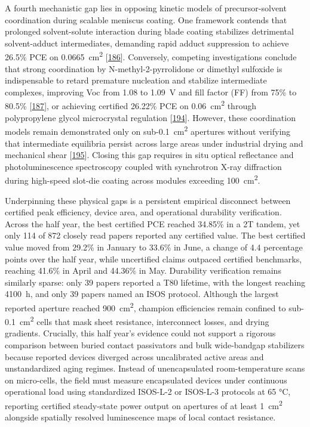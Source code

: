\documentclass[
  11pt,
]{article}
\begin{document}
A fourth mechanistic gap lies in opposing kinetic models of
precursor-solvent coordination during scalable meniscus coating. One
framework contends that prolonged solvent-solute interaction during
blade coating stabilizes detrimental solvent-adduct intermediates,
demanding rapid adduct suppression to achieve 26.5\% PCE on
\qty{0.0665}{\centi\meter\squared}
{[}\href{https://doi.org/10.1038/s41467-026-68439-8}{186}{]}.
Conversely, competing investigations conclude that strong coordination
by N-methyl-2-pyrrolidone or dimethyl sulfoxide is indispensable to
retard premature nucleation and stabilize intermediate complexes,
improving Voc from 1.08 to \qty{1.09}{\volt} and fill factor (FF) from
75\% to 80.5\% {[}\href{https://doi.org/10.1063/5.0297564}{187}{]}, or
achieving certified 26.22\% PCE on \qty{0.06}{\centi\meter\squared}
through polypropylene glycol microcrystal regulation
{[}\href{https://doi.org/10.1002/adma.202522508}{194}{]}. However, these
coordination models remain demonstrated only on
sub-\qty{0.1}{\centi\meter\squared} apertures without verifying that
intermediate equilibria persist across large areas under industrial
drying and mechanical shear
{[}\href{https://doi.org/10.20517/ss.2025.128}{195}{]}. Closing this gap
requires in situ optical reflectance and photoluminescence spectroscopy
coupled with synchrotron X-ray diffraction during high-speed slot-die
coating across modules exceeding \qty{100}{\centi\meter\squared}.

Underpinning these physical gaps is a persistent empirical disconnect
between certified peak efficiency, device area, and operational
durability verification. Across the half year, the best certified PCE
reached 34.85\% in a 2T tandem, yet only 114 of 872 closely read papers
reported any certified value. The best certified value moved from 29.2\%
in January to 33.6\% in June, a change of 4.4 percentage points over the
half year, while uncertified claims outpaced certified benchmarks,
reaching 41.6\% in April and 44.36\% in May. Durability verification
remains similarly sparse: only 39 papers reported a T80 lifetime, with
the longest reaching \qty{4100}{\hour}, and only 39 papers named an ISOS
protocol. Although the largest reported aperture reached
\qty{900}{\centi\meter\squared}, champion efficiencies remain confined
to sub-\qty{0.1}{\centi\meter\squared} cells that mask sheet resistance,
interconnect losses, and drying gradients. Crucially, this half year's
evidence could not support a rigorous comparison between buried contact
passivators and bulk wide-bandgap stabilizers because reported devices
diverged across uncalibrated active areas and unstandardized aging
regimes. Instead of unencapsulated room-temperature scans on
micro-cells, the field must measure encapsulated devices under
continuous operational load using standardized ISOS-L-2 or ISOS-L-3
protocols at 65 °C, reporting certified steady-state power output on
apertures of at least \qty{1}{\centi\meter\squared} alongside spatially
resolved luminescence maps of local contact resistance.
\end{document}
